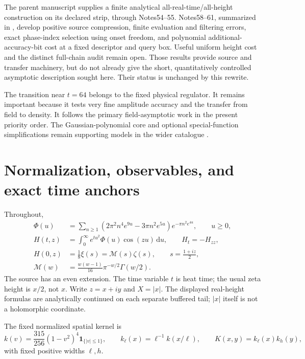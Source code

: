 \documentclass[11pt]{article}
\newcommand{\dd}{\,\mathrm d}
\newcommand{\Mc}{\mathcal M}
\numberwithin{equation}{section}
\begin{document}
The parent manuscript \cite{parent} supplies a finite analytical
all-real-time/all-height construction on its declared strip, through
Notes54--55. Notes58--61, summarized in \cite{summary62}, develop
positive source compression, finite evaluation and filtering errors,
exact phase-index selection using onset freedom, and polynomial
additional-accuracy-bit cost at a fixed descriptor and query box.
Useful uniform height cost and the distinct full-chain audit remain
open. Those results provide source and transfer machinery, but do not
already give the short, quantitatively controlled asymptotic
description sought here. Their status is unchanged by this rewrite.

The transition near \(t=64\) belongs to the fixed physical regulator.
It remains important because it tests very fine amplitude accuracy
and the transfer from field to density. It follows the primary
field-asymptotic work in the present priority order. The
Gaussian-polynomial core and optional special-function simplifications
remain supporting models in the wider catalogue \cite{ansatz01}.

\section{Normalization, observables, and exact time anchors}
\label{sec:normalization}
Throughout,
\begin{align}
\Phi(u)&=\sum_{n\ge1}
 (2\pi^2n^4e^{9u}-3\pi n^2e^{5u})e^{-\pi n^2e^{4u}},
 \qquad u\ge0, \label{eq:source}\\
H(t,z)&=\int_0^\infty e^{tu^2}\Phi(u)\cos(zu)\dd u,
 \qquad H_t=-H_{zz}, \label{eq:heat}\\
H(0,z)&=\frac18\xi(s)=\Mc(s)\zeta(s),
 \qquad s=\frac{1+iz}{2}, \label{eq:anchor-zero}\\
\Mc(w)&=\frac{w(w-1)}{16}\pi^{-w/2}\Gamma(w/2).
 \label{eq:gamma}
\end{align}
The source has an even extension. The time variable \(t\) is heat time;
the usual zeta height is \(x/2\), not \(x\). Write \(z=x+iy\) and \(X=|x|\).
The displayed real-height formulas are analytically continued on each
separate buffered tail; \(|x|\) itself is not a holomorphic coordinate.

The fixed normalized spatial kernel is
\begin{equation}
k(v)=\frac{315}{256}(1-v^2)^4\mathbf1_{\{|v|\le1\}},\qquad
k_\ell(x)=\ell^{-1}k(x/\ell),\qquad K(x,y)=k_\ell(x)k_h(y),
\label{eq:kernel}
\end{equation}
with fixed positive widths \(\ell,h\).
\end{document}
